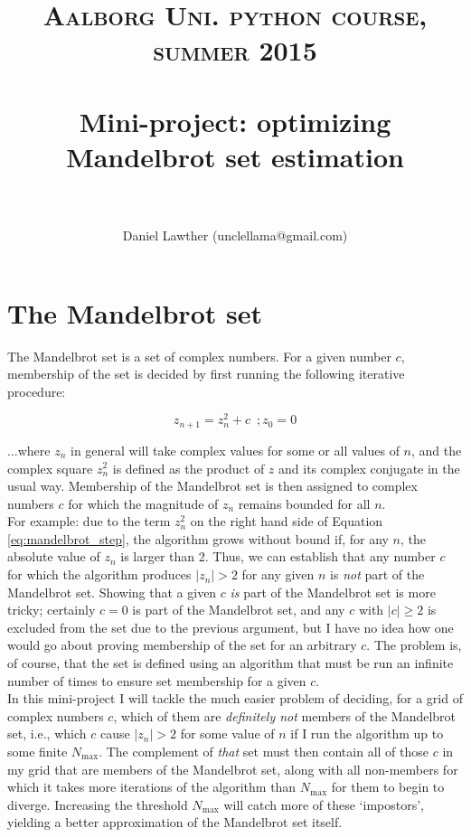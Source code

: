 \documentclass[paper=a4, fontsize=11pt]{scrartcl} %
\title{	
\normalfont \normalsize 
\textsc{Aalborg Uni. python course, summer 2015} \\ [25pt] %
\horrule{0.5pt} \\[0.4cm] %
\huge Mini-project: optimizing Mandelbrot set estimation\\ %
\horrule{2pt} \\[0.5cm] %
}
\author{Daniel Lawther (unclellama@gmail.com)} %
\numberwithin{equation}{section} %
\numberwithin{figure}{section} %
\numberwithin{table}{section} %
\begin{document}
\maketitle %



\section{The Mandelbrot set}

The Mandelbrot set is a set of complex numbers. For a given number $c$, membership of the set is decided by first running the following iterative procedure:

\begin{equation}\label{eq:mandelbrot_step}
z_{n+1}=z_n^2+c\,\,\,;z_0=0
\end{equation}

...where $z_n$ in general will take complex values for some or all values of $n$, and the complex square $z_n^2$ is defined as the product of $z$ and its complex conjugate in the usual way. Membership of the Mandelbrot set is then assigned to complex numbers $c$ for which the magnitude of $z_n$ remains bounded for all $n$.\\

For example: due to the term $z_n^2$ on the right hand side of Equation \ref{eq:mandelbrot_step}, the algorithm grows without bound if, for any $n$, the absolute value of $z_n$ is larger than 2. Thus, we can establish that any number $c$ for which the algorithm produces $|z_n|>2$ for any given $n$ is \emph{not} part of the Mandelbrot set. Showing that a given $c$ \emph{is} part of the Mandelbrot set is more tricky; certainly $c=0$ is part of the Mandelbrot set, and any $c$ with $|c|\ge2$ is excluded from the set due to the previous argument, but I have no idea how one would go about proving membership of the set for an arbitrary $c$. The problem is, of course, that the set is defined using an algorithm that must be run an infinite number of times to ensure set membership for a given $c$. \\

In this mini-project I will tackle the much easier problem of deciding, for a grid of complex numbers $c$, which of them are \emph{definitely not} members of the Mandelbrot set, i.e., which $c$ cause $|z_n|>2$ for some value of $n$ if I run the algorithm up to some finite $N_\mathrm{max}$. The complement of \emph{that} set must then contain all of those $c$ in my grid that are members of the Mandelbrot set, along with all non-members for which it takes more iterations of the algorithm than $N_{\mathrm{max}}$ for them to begin to diverge. Increasing the threshold $N_\mathrm{max}$ will catch more of these `impostors', yielding a better approximation of the Mandelbrot set itself.\\
\end{document}
